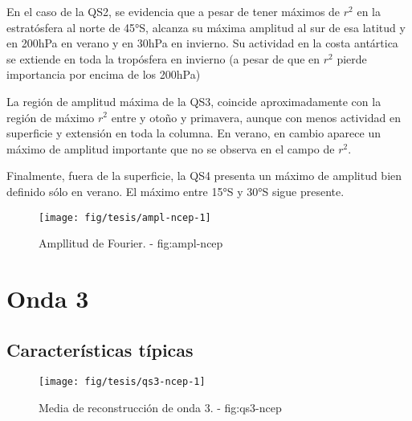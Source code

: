 \documentclass[spanish,a4paper]{book}
\begin{document}
En el caso de la QS2, se evidencia que a pesar de tener máximos de
\(r^2\) en la estratósfera al norte de 45°S, alcanza su máxima amplitud
al sur de esa latitud y en 200hPa en verano y en 30hPa en invierno. Su
actividad en la costa antártica se extiende en toda la tropósfera en
invierno (a pesar de que en \(r^2\) pierde importancia por encima de los
200hPa)

La región de amplitud máxima de la QS3, coincide aproximadamente con la
región de máximo \(r^2\) entre y otoño y primavera, aunque con menos
actividad en superficie y extensión en toda la columna. En verano, en
cambio aparece un máximo de amplitud importante que no se observa en el
campo de \(r^2\).

Finalmente, fuera de la superficie, la QS4 presenta un máximo de
amplitud bien definido sólo en verano. El máximo entre 15°S y 30°S sigue
presente.

\begin{figure}

{\centering \texttt{[image: fig/tesis/ampl-ncep-1]} 

}

\caption{Ampllitud de Fourier. - fig:ampl-ncep}\label{fig:ampl-ncep}
\end{figure}


\chapter{Onda 3}\label{onda-3}


\section{Características típicas}\label{caracteristicas-tipicas}

\begin{figure*}
\texttt{[image: fig/tesis/qs3-ncep-1]} \caption{Media de reconstrucción de onda 3. - fig:qs3-ncep}\label{fig:qs3-ncep}
\end{figure*}
\end{document}
